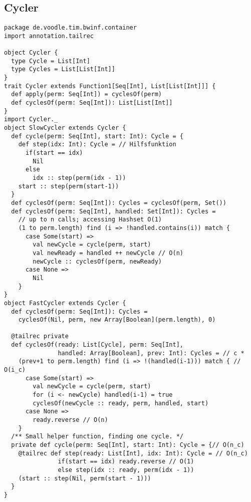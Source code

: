 \subsection{Cycler}
\begin{lstlisting}
package de.voodle.tim.bwinf.container
import annotation.tailrec

object Cycler {
  type Cycle = List[Int]
  type Cycles = List[List[Int]]
}
trait Cycler extends Function1[Seq[Int], List[List[Int]]] {
  def apply(perm: Seq[Int]) = cyclesOf(perm)
  def cyclesOf(perm: Seq[Int]): List[List[Int]]
}
import Cycler._
object SlowCycler extends Cycler {
  def cycle(perm: Seq[Int], start: Int): Cycle = {
    def step(idx: Int): Cycle = // Hilfsfunktion
      if(start == idx)
        Nil
      else
        idx :: step(perm(idx - 1))
    start :: step(perm(start-1))
  }
  def cyclesOf(perm: Seq[Int]): Cycles = cyclesOf(perm, Set())
  def cyclesOf(perm: Seq[Int], handled: Set[Int]): Cycles =
    // up to n calls; accessing Hashset O(1)
    (1 to perm.length) find (i => !handled.contains(i)) match {
      case Some(start) =>
        val newCycle = cycle(perm, start)
        val newReady = handled ++ newCycle // O(n)
        newCycle :: cyclesOf(perm, newReady)
      case None =>
        Nil
    }
}
object FastCycler extends Cycler {
  def cyclesOf(perm: Seq[Int]): Cycles =
    cyclesOf(Nil, perm, new Array[Boolean](perm.length), 0)

  @tailrec private
  def cyclesOf(ready: List[Cycle], perm: Seq[Int],
               handled: Array[Boolean], prev: Int): Cycles = // c *
    (prev+1 to perm.length) find (i => !(handled(i-1))) match { // O(i_c)
      case Some(start) =>
        val newCycle = cycle(perm, start)
        for (i <- newCycle) handled(i-1) = true
        cyclesOf(newCycle :: ready, perm, handled, start)
      case None =>
        ready.reverse // O(n)
    }
  /** Small helper function, finding one cycle. */
  private def cycle(perm: Seq[Int], start: Int): Cycle = {// O(n_c)
    @tailrec def step(ready: List[Int], idx: Int): Cycle = // O(n_c)
               if(start == idx) ready.reverse // O(1)
               else step(idx :: ready, perm(idx - 1))
    (start :: step(Nil, perm(start - 1)))
  }
}
\end{lstlisting}
\clearpage
